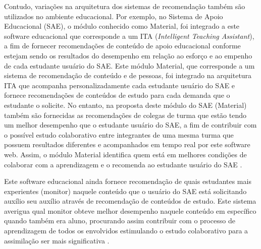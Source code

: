 Contudo, variações na arquitetura dos sistemas de recomendação também são utilizados no ambiente educacional. Por exemplo, no Sistema de Apoio Educacional (SAE), o módulo conhecido como Material, foi integrado a este software educacional que corresponde a um ITA (\textit{Intelligent Teaching Assistant}), a fim de fornecer recomendações de conteúdo de apoio educacional conforme estejam sendo os resultados do desempenho em relação ao esforço e ao empenho de cada estudante usuário do SAE. Este módulo Material, que corresponde a um sistema de recomendação de conteúdo e de pessoas, foi integrado na arquitetura ITA que acompanha personalizadamente cada estudante usuário do SAE e fornece recomendações de conteúdos de estudo para cada demanda que o estudante o solicite. No entanto, na proposta deste módulo do SAE (Material) também são fornecidas as recomendações de colegas de turma que estão tendo um melhor desempenho que o estudante usuário do SAE, a fim de contribuir com o possível estudo colaborativo entre integrantes de uma mesma turma que possuem resultados diferentes e acompanhados em tempo real por este software web. Assim, o módulo Material identifica quem está em melhores condições de colaborar com a aprendizagem e o recomenda ao estudante usuário do SAE \cite{tcc-viana-e-bueno}.


Este software educacional ainda fornece recomendação de quais estudantes mais experientes (monitor) naquele conteúdo que o usuário do SAE está solicitando auxílio seu auxílio através de recomendação de conteúdos de estudo. Este sistema averigua qual monitor obteve melhor desempenho naquele conteúdo em específico quando também era aluno, procurando assim contribuir com o processo de aprendizagem de todos os envolvidos estimulando o estudo colaborativo para a assimilação ser mais significativa \cite{simposio2013}.


